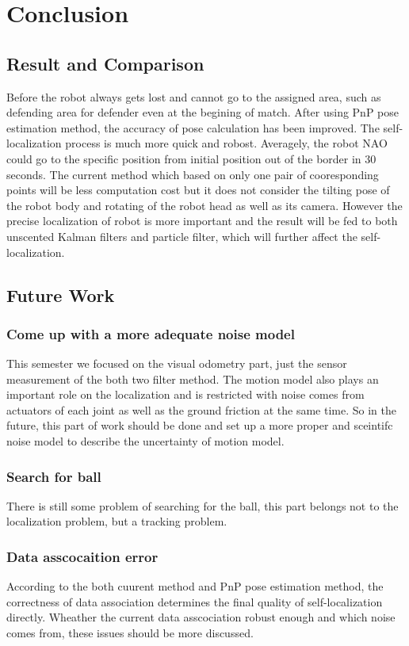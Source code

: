 \chapter{Conclusion}
\section{Result and Comparison}
Before the robot always gets lost and cannot go to the assigned area, such as defending area for defender even at the begining of match. After using PnP pose estimation method, the accuracy of pose calculation has been improved. The self-localization process is much more quick and robost. Averagely, the robot NAO could go to the specific position from initial position out of the border in 30 seconds. 
The current method which based on only one pair of cooresponding points will be less computation cost but it does not consider the tilting pose of the robot body and rotating of the robot head as well as its camera. However the precise localization of robot is more important and the result will be fed to both unscented Kalman filters and particle filter, which will further affect the self-localization.
\section{Future Work}
\subsection{Come up with a more adequate noise model}
This semester we focused on the visual odometry part, just the sensor measurement of the both two filter method. The motion model also plays an important role on the localization and is restricted with noise comes from actuators of each joint as well as the ground friction at the same time. So in the future, this part of work should be done and set up a more proper and sceintifc noise model to describe the uncertainty of motion model.

\subsection{Search for ball}
There is still some problem of searching for the ball, this part belongs not to the localization problem, but a tracking problem. 

\subsection{Data asscocaition error}
According to the both cuurent method and PnP pose estimation method, the correctness of data association determines the final quality of self-localization directly. Wheather the current data asscociation robust enough and which noise comes from, these issues should be more discussed.

